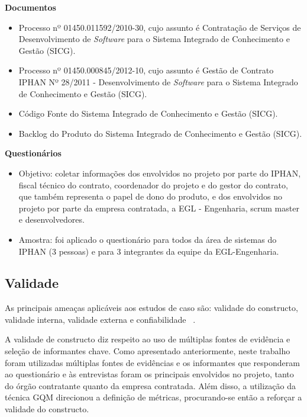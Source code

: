 \textbf{Documentos}
\begin{itemize}
\item Processo nº 01450.011592/2010-30, cujo assunto é Contratação de Serviços de Desenvolvimento de \textit{Software} para o Sistema Integrado de Conhecimento e Gestão (SICG). 
\item Processo nº 01450.000845/2012-10, cujo assunto é Gestão de Contrato IPHAN Nº 28/2011 - Desenvolvimento de \textit{Software} para o Sistema Integrado de Conhecimento e Gestão (SICG). 
\item Código Fonte do Sistema Integrado de Conhecimento e Gestão (SICG).
\item Backlog do Produto do Sistema Integrado de Conhecimento e Gestão (SICG).
\end{itemize}

\textbf{Questionários}
\begin{itemize}
\item Objetivo: coletar informações dos envolvidos no projeto por parte do IPHAN,  fiscal técnico do contrato, coordenador do projeto e do gestor do contrato, que também representa o papel de dono do produto, e dos envolvidos no projeto por parte da empresa contratada, a EGL - Engenharia, scrum master e desenvolvedores. 
\item Amostra: foi aplicado o questionário para todos da área de sistemas do IPHAN (3 pessoas) e para 3 integrantes da equipe da EGL-Engenharia.
\end{itemize}

\subsection[Validade]{Validade}

As principais ameaças aplicáveis aos estudos de caso 
são: validade do constructo, validade interna, validade externa e confiabilidade ~\cite{yin}.

A validade de constructo diz respeito ao uso de múltiplas fontes de evidência e seleção de informantes chave. Como apresentado anteriormente, neste trabalho foram utilizadas múltiplas fontes de evidências e os informantes que responderam ao questionário e às entrevistas foram os principais envolvidos no projeto, tanto do órgão contratante quanto da empresa contratada. Além disso, a utilização da técnica GQM direcionou a definição de métricas, procurando-se então a reforçar a validade do constructo.

